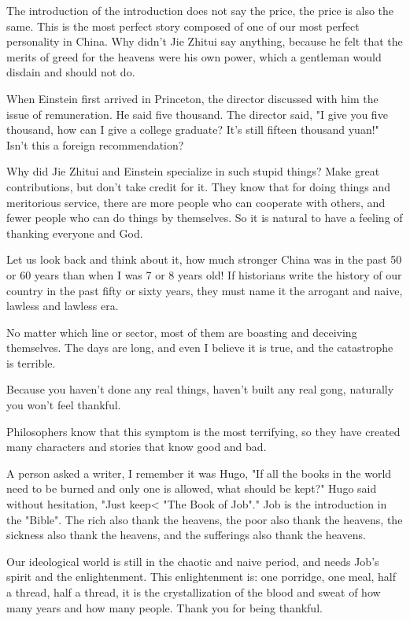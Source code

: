\begin{acknowledgement*}
The introduction of the introduction does not say the price, the price is also the same. This is the most perfect story composed of one of our most perfect personality in China. Why didn't Jie Zhitui say anything, because he felt that the merits of greed for the heavens were his own power, which a gentleman would disdain and should not do.

When Einstein first arrived in Princeton, the director discussed with him the issue of remuneration. He said five thousand. The director said, "I give you five thousand, how can I give a college graduate? It's still fifteen thousand yuan!" Isn't this a foreign recommendation?

Why did Jie Zhitui and Einstein specialize in such stupid things? Make great contributions, but don't take credit for it. They know that for doing things and meritorious service, there are more people who can cooperate with others, and fewer people who can do things by themselves. So it is natural to have a feeling of thanking everyone and God.

Let us look back and think about it, how much stronger China was in the past 50 or 60 years than when I was 7 or 8 years old! If historians write the history of our country in the past fifty or sixty years, they must name it the arrogant and naive, lawless and lawless era.

No matter which line or sector, most of them are boasting and deceiving themselves. The days are long, and even I believe it is true, and the catastrophe is terrible.

Because you haven't done any real things, haven't built any real gong, naturally you won't feel thankful.

Philosophers know that this symptom is the most terrifying, so they have created many characters and stories that know good and bad.

A person asked a writer, I remember it was Hugo, "If all the books in the world need to be burned and only one is allowed, what should be kept?" Hugo said without hesitation, "Just keep< "The Book of Job"." Job is the introduction in the "Bible". The rich also thank the heavens, the poor also thank the heavens, the sickness also thank the heavens, and the sufferings also thank the heavens.

Our ideological world is still in the chaotic and naive period, and needs Job's spirit and the enlightenment. This enlightenment is: one porridge, one meal, half a thread, half a thread, it is the crystallization of the blood and sweat of how many years and how many people. Thank you for being thankful.

\end{acknowledgement*}


